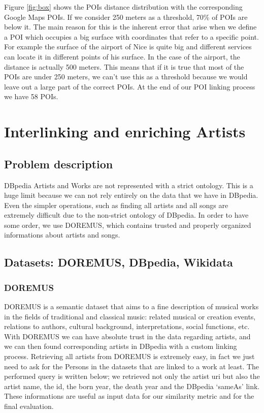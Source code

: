 \documentclass[paper=a4, fontsize=11pt]{scrartcl}
\begin{document}
Figure \ref{fig:box} shows the POIs distance distribution with the corresponding Google Maps POIs. If we consider 250 meters as a threshold, 70\% of POIs are below it. The main reason for this is the inherent error that arise when we define a POI which occupies a big surface with coordinates that refer to a specific point. For example the surface of the airport of Nice is quite big and different services can locate it in different points of his surface. In the case of the airport, the distance is actually 500 meters. This means that if it is true that most of the POIs are under 250 meters, we can't use this as a threshold because we would leave out a large part of the correct POIs.
At the end of our POI linking process we have 58 POIs.

\section{Interlinking and enriching Artists}
\subsection{Problem description}
DBpedia Artists and Works are not represented with a strict ontology. 
This is a huge limit because we can not rely entirely on the data that we have in DBpedia. Even the simpler operations, such as finding all artists and all songs are extremely difficult due to the non-strict ontology of DBpedia. In order to have some order, we use DOREMUS, which contains trusted and properly organized informations about artists and songs.

\subsection{Datasets: DOREMUS, DBpedia, Wikidata}
\subsubsection{DOREMUS}
DOREMUS is a semantic dataset that aims to a fine description of musical works in the fields of traditional and classical music: related musical or creation events, relations to authors, cultural background, interpretations, social functions, etc.
With DOREMUS we can have absolute trust in the data regarding artists, and we can then found corresponding artists in DBpedia with a custom linking process.
Retrieving all artists from DOREMUS is extremely easy, in fact we just need to ask for the Persons in the datasets that are linked to a work at least. The performed query is written below; we retrieved not only the artist uri but also the artist name, the id, the born year, the death year and the DBpedia `sameAs' link. These informations are useful as input data for our similarity metric and for the final evaluation.
\end{document}
